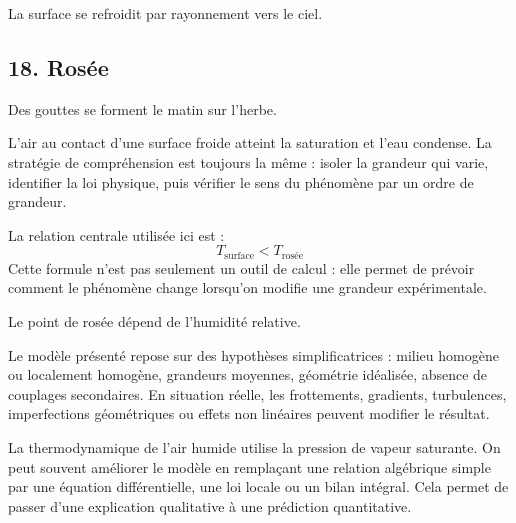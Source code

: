 \documentclass[11pt,a4paper]{article}
\begin{document}
\begin{corrigebox}[Indication]
La surface se refroidit par rayonnement vers le ciel.
\end{corrigebox}


\subsection{18. Rosée}

\begin{exemplebox}
Des gouttes se forment le matin sur l'herbe.
\end{exemplebox}

\begin{methodebox}
L'air au contact d'une surface froide atteint la saturation et l'eau condense.
La stratégie de compréhension est toujours la même : isoler la grandeur qui varie, identifier la loi physique, puis vérifier le sens du phénomène par un ordre de grandeur.
\end{methodebox}

\begin{theorembox}
La relation centrale utilisée ici est :
\[
T_{\mathrm{surface}}<T_{\mathrm{rosée}}
\]
Cette formule n'est pas seulement un outil de calcul : elle permet de prévoir comment le phénomène change lorsqu'on modifie une grandeur expérimentale.
\end{theorembox}

\begin{odgbox}
Le point de rosée dépend de l'humidité relative.
\end{odgbox}

\begin{attentionbox}
Le modèle présenté repose sur des hypothèses simplificatrices : milieu homogène ou localement homogène, grandeurs moyennes, géométrie idéalisée, absence de couplages secondaires. En situation réelle, les frottements, gradients, turbulences, imperfections géométriques ou effets non linéaires peuvent modifier le résultat.
\end{attentionbox}

\begin{approfondissementbox}
La thermodynamique de l'air humide utilise la pression de vapeur saturante.
On peut souvent améliorer le modèle en remplaçant une relation algébrique simple par une équation différentielle, une loi locale ou un bilan intégral. Cela permet de passer d'une explication qualitative à une prédiction quantitative.
\end{approfondissementbox}
\end{document}
